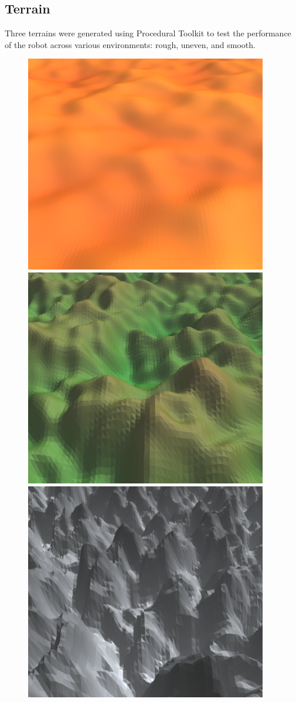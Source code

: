 \documentclass{article}
\begin{document}
\subsection{Terrain}
\label{sec:Terrain Imp}
Three terrains were generated using Procedural Toolkit  to test the performance of the robot across various environments: rough, uneven, and smooth. 
\begin{figure}[H]
\centering
\includegraphics[scale=0.3]{smoothTerrain}
\includegraphics[scale=0.3]{unevenTerrain}
\includegraphics[scale=0.3]{roughTerrain}

\end{figure}
\end{document}
